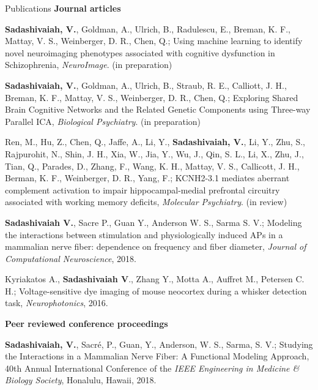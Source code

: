 \documentclass{resume}
\begin{document}
\vspace{1em} 
\begin{rSection}{Publications}
\textbf{\large Journal articles}
\begin{publications}
\item \textbf{Sadashivaiah, V.}, Goldman, A., Ulrich, B., Radulescu, E., Breman, K. F., Mattay, V. S., Weinberger, D. R., Chen, Q.; Using machine learning to identify novel neuroimaging phenotypes associated with cognitive dysfunction in Schizophrenia, \textit{NeuroImage}. (in preparation)
 
\item \textbf{Sadashivaiah, V.}, Goldman, A., Ulrich, B., Straub, R. E., Calliott, J. H., Breman, K. F., Mattay, V. S., Weinberger, D. R., Chen, Q.; Exploring Shared Brain Cognitive Networks and the Related Genetic Components using Three-way Parallel ICA, \textit{Biological Psychiatry}. (in preparation) 

\item Ren, M., Hu, Z., Chen, Q., Jaffe, A., Li, Y., \textbf{Sadashivaiah, V.}, Li, Y., Zhu, S., Rajpurohit, N., Shin, J. H., Xia, W., Jia, Y., Wu, J., Qin, S. L., Li, X., Zhu, J., Tian, Q., Parades, D., Zhang, F., Wang, K. H., Mattay, V. S., Callicott, J. H., Berman, K. F., Weinberger, D. R., Yang, F.; KCNH2-3.1 mediates aberrant complement activation to impair hippocampal-medial prefrontal circuitry associated with working memory deficits, \textit{Molecular Psychiatry}. (in review)

\item \textbf{Sadashivaiah V.}, Sacre P., Guan Y., Anderson W. S., Sarma S. V.; Modeling the interactions between stimulation and physiologically induced APs in a mammalian nerve fiber: dependence on frequency and fiber diameter, \textit{Journal of Computational Neuroscience}, 2018.

\item Kyriakatos A., \textbf{Sadashivaiah V}., Zhang Y., Motta A., Auffret M., Petersen C. H.; Voltage-sensitive dye imaging of mouse neocortex during a whisker detection task, \textit{Neurophotonics}, 2016.\\

\end{publications}

\textbf{\large Peer reviewed conference proceedings}
\begin{conferences}

\item \textbf{Sadashivaiah, V.}, Sacré, P., Guan, Y., Anderson, W. S., Sarma, S. V.; Studying the Interactions in a Mammalian Nerve Fiber: A Functional Modeling Approach, 40th Annual International Conference of the \textit{IEEE Engineering in Medicine \& Biology Society}, Honalulu, Hawaii, 2018.


\end{conferences}
\end{rSection}
\end{document}
